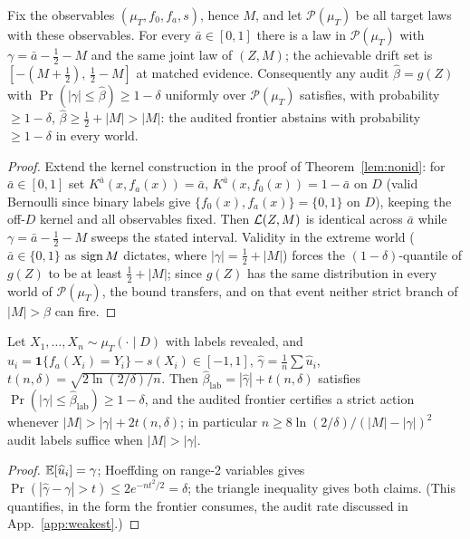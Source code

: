 \begin{theorem}\label{thm:aud-A}
Fix the observables $(\mu_T,f_0,f_a,s)$, hence $M$, and let $\mathcal P(\mu_T)$ be all target
laws with these observables. For every $\bar a\in[0,1]$ there is a law in $\mathcal P(\mu_T)$
with $\gamma=\bar a-\tfrac12-M$ and the same joint law of $(Z,M)$; the achievable drift set is
$[-(M+\tfrac12),\,\tfrac12-M]$ at matched evidence. Consequently any audit
$\widehat\beta=g(Z)$ with $\Pr(|\gamma|\le\widehat\beta)\ge1-\delta$ uniformly over
$\mathcal P(\mu_T)$ satisfies, with probability $\ge1-\delta$,
$\widehat\beta\ge\tfrac12+|M|>|M|$: the audited frontier abstains with probability $\ge1-\delta$
in every world.
\end{theorem}
\begin{proof}
Extend the kernel construction in the proof of Theorem~\ref{lem:nonid}: for $\bar a\in[0,1]$ set
$K^{\bar a}(x,f_a(x))=\bar a$, $K^{\bar a}(x,f_0(x))=1-\bar a$ on $D$ (valid Bernoulli since
binary labels give $\{f_0(x),f_a(x)\}=\{0,1\}$ on $D$), keeping the off-$D$ kernel and all
observables fixed. Then $\mathcal{L}(Z,M)$ is identical across $\bar a$ while
$\gamma=\bar a-\tfrac12-M$ sweeps the stated interval. Validity in the extreme world
($\bar a\in\{0,1\}$ as $\operatorname{sign} M$ dictates, where $|\gamma|=\tfrac12+|M|$) forces the
$(1-\delta)$-quantile of $g(Z)$ to be at least $\tfrac12+|M|$; since $g(Z)$ has the same
distribution in every world of $\mathcal P(\mu_T)$, the bound transfers, and on that event
neither strict branch of $|M|>\widehat\beta$ can fire.
\end{proof}

\begin{theorem}\label{thm:aud-B}
Let $X_1,\dots,X_n\sim\mu_T(\cdot\mid D)$ with labels revealed, and
$\widehat u_i=\mathbf 1\{f_a(X_i)=Y_i\}-s(X_i)\in[-1,1]$,
$\widehat\gamma=\tfrac1n\sum\widehat u_i$, $t(n,\delta)=\sqrt{2\ln(2/\delta)/n}$. Then
$\widehat\beta_{\mathrm{lab}}=|\widehat\gamma|+t(n,\delta)$ satisfies
$\Pr(|\gamma|\le\widehat\beta_{\mathrm{lab}})\ge1-\delta$, and the audited frontier certifies a
strict action whenever $|M|>|\gamma|+2t(n,\delta)$; in particular
$n\ge 8\ln(2/\delta)/(|M|-|\gamma|)^2$ audit labels suffice when $|M|>|\gamma|$.
\end{theorem}
\begin{proof}
$\mathbb{E}[\widehat u_i]=\gamma$; Hoeffding on range-2 variables gives
$\Pr(|\widehat\gamma-\gamma|>t)\le2e^{-nt^2/2}=\delta$; the triangle inequality gives both
claims. (This quantifies, in the form the frontier consumes, the audit rate discussed in
App.~\ref{app:weakest}.)
\end{proof}

